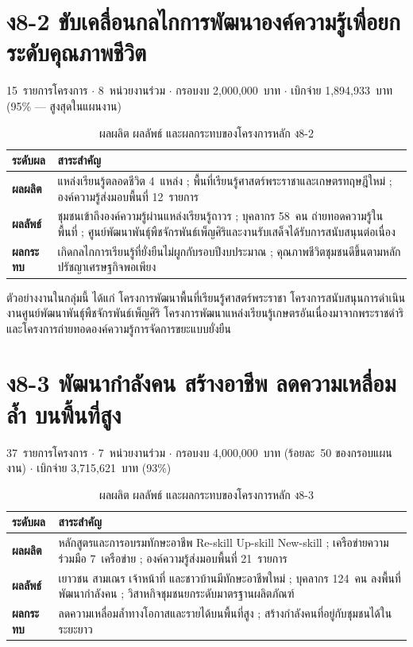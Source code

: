 \section{ง8-2 ขับเคลื่อนกลไกการพัฒนาองค์ความรู้เพื่อยกระดับคุณภาพชีวิต}
15~รายการโครงการ $\cdot$ 8~หน่วยงานร่วม $\cdot$ กรอบงบ 2,000,000~บาท $\cdot$ เบิกจ่าย 1,894,933~บาท
(95\% --- สูงสุดในแผนงาน)

\begin{table}[H]
\centering
\caption{ผลผลิต ผลลัพธ์ และผลกระทบของโครงการหลัก ง8-2}
\small
\begin{tabular}{L{2.2cm}L{11.5cm}}
\toprule
{}
\textbf{ระดับผล} & \textbf{สาระสำคัญ}\\
\midrule
\textbf{ผลผลิต} & แหล่งเรียนรู้ตลอดชีวิต 4~แหล่ง ; พื้นที่เรียนรู้ศาสตร์พระราชาและเกษตรทฤษฎีใหม่ ; องค์ความรู้ส่งมอบพื้นที่ 12~รายการ\\
\textbf{ผลลัพธ์} & ชุมชนเข้าถึงองค์ความรู้ผ่านแหล่งเรียนรู้ถาวร ; บุคลากร 58~คน ถ่ายทอดความรู้ในพื้นที่ ; ศูนย์พัฒนาพันธุ์พืชจักรพันธ์เพ็ญศิริและงานรับเสด็จได้รับการสนับสนุนต่อเนื่อง\\
\textbf{ผลกระทบ} & เกิดกลไกการเรียนรู้ที่ยั่งยืนไม่ผูกกับรอบปีงบประมาณ ; คุณภาพชีวิตชุมชนดีขึ้นตามหลักปรัชญาเศรษฐกิจพอเพียง\\
\bottomrule
\end{tabular}
\end{table}

ตัวอย่างงานในกลุ่มนี้ ได้แก่ โครงการพัฒนาพื้นที่เรียนรู้ศาสตร์พระราชา
โครงการสนับสนุนการดำเนินงานศูนย์พัฒนาพันธุ์พืชจักรพันธ์เพ็ญศิริ
โครงการพัฒนาแหล่งเรียนรู้เกษตรอันเนื่องมาจากพระราชดำริ
และโครงการถ่ายทอดองค์ความรู้การจัดการขยะแบบยั่งยืน

\section{ง8-3 พัฒนากำลังคน สร้างอาชีพ ลดความเหลื่อมล้ำ บนพื้นที่สูง}
37~รายการโครงการ $\cdot$ 7~หน่วยงานร่วม $\cdot$ กรอบงบ 4,000,000~บาท (ร้อยละ~50 ของกรอบแผนงาน)
$\cdot$ เบิกจ่าย 3,715,621~บาท (93\%)

\begin{table}[H]
\centering
\caption{ผลผลิต ผลลัพธ์ และผลกระทบของโครงการหลัก ง8-3}
\small
\begin{tabular}{L{2.2cm}L{11.5cm}}
\toprule
{}
\textbf{ระดับผล} & \textbf{สาระสำคัญ}\\
\midrule
\textbf{ผลผลิต} & หลักสูตรและการอบรมทักษะอาชีพ Re-skill Up-skill New-skill ; เครือข่ายความร่วมมือ 7~เครือข่าย ; องค์ความรู้ส่งมอบพื้นที่ 21~รายการ\\
\textbf{ผลลัพธ์} & เยาวชน สามเณร เจ้าหน้าที่ และชาวบ้านมีทักษะอาชีพใหม่ ; บุคลากร 124~คน ลงพื้นที่พัฒนากำลังคน ; วิสาหกิจชุมชนยกระดับมาตรฐานผลิตภัณฑ์\\
\textbf{ผลกระทบ} & ลดความเหลื่อมล้ำทางโอกาสและรายได้บนพื้นที่สูง ; สร้างกำลังคนที่อยู่กับชุมชนได้ในระยะยาว\\
\bottomrule
\end{tabular}
\end{table}

